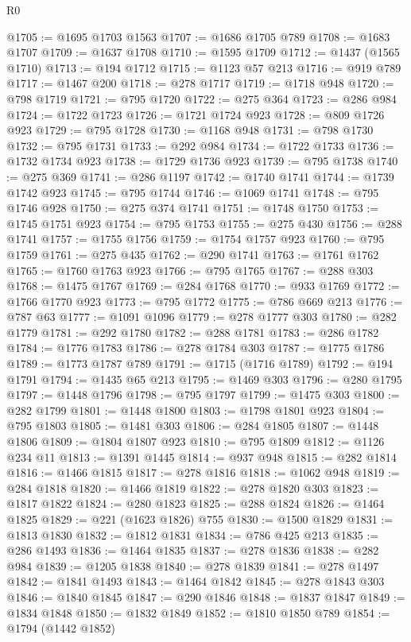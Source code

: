\begin{lexlean}{R0}
\begin{coremodule}
@1705 := @1695 @1703 @1563
@1707 := @1686 @1705 @789
@1708 := @1683 @1707
@1709 := @1637 @1708
@1710 := @1595 @1709
@1712 := @1437 (@1565 @1710)
@1713 := @194 @1712
@1715 := @1123 @57 @213
@1716 := @919 @789
@1717 := @1467 @200
@1718 := @278 @1717
@1719 := @1718 @948
@1720 := @798 @1719
@1721 := @795 @1720
@1722 := @275 @364
@1723 := @286 @984
@1724 := @1722 @1723
@1726 := @1721 @1724 @923
@1728 := @809 @1726 @923
@1729 := @795 @1728
@1730 := @1168 @948
@1731 := @798 @1730
@1732 := @795 @1731
@1733 := @292 @984
@1734 := @1722 @1733
@1736 := @1732 @1734 @923
@1738 := @1729 @1736 @923
@1739 := @795 @1738
@1740 := @275 @369
@1741 := @286 @1197
@1742 := @1740 @1741
@1744 := @1739 @1742 @923
@1745 := @795 @1744
@1746 := @1069 @1741
@1748 := @795 @1746 @928
@1750 := @275 @374 @1741
@1751 := @1748 @1750
@1753 := @1745 @1751 @923
@1754 := @795 @1753
@1755 := @275 @430
@1756 := @288 @1741
@1757 := @1755 @1756
@1759 := @1754 @1757 @923
@1760 := @795 @1759
@1761 := @275 @435
@1762 := @290 @1741
@1763 := @1761 @1762
@1765 := @1760 @1763 @923
@1766 := @795 @1765
@1767 := @288 @303
@1768 := @1475 @1767
@1769 := @284 @1768
@1770 := @933 @1769
@1772 := @1766 @1770 @923
@1773 := @795 @1772
@1775 := @786 @669 @213
@1776 := @787 @63
@1777 := @1091 @1096
@1779 := @278 @1777 @303
@1780 := @282 @1779
@1781 := @292 @1780
@1782 := @288 @1781
@1783 := @286 @1782
@1784 := @1776 @1783
@1786 := @278 @1784 @303
@1787 := @1775 @1786
@1789 := @1773 @1787 @789
@1791 := @1715 (@1716 @1789)
@1792 := @194 @1791
@1794 := @1435 @65 @213
@1795 := @1469 @303
@1796 := @280 @1795
@1797 := @1448 @1796
@1798 := @795 @1797
@1799 := @1475 @303
@1800 := @282 @1799
@1801 := @1448 @1800
@1803 := @1798 @1801 @923
@1804 := @795 @1803
@1805 := @1481 @303
@1806 := @284 @1805
@1807 := @1448 @1806
@1809 := @1804 @1807 @923
@1810 := @795 @1809
@1812 := @1126 @234 @11
@1813 := @1391 @1445
@1814 := @937 @948
@1815 := @282 @1814
@1816 := @1466 @1815
@1817 := @278 @1816
@1818 := @1062 @948
@1819 := @284 @1818
@1820 := @1466 @1819
@1822 := @278 @1820 @303
@1823 := @1817 @1822
@1824 := @280 @1823
@1825 := @288 @1824
@1826 := @1464 @1825
@1829 := @221 (@1623 @1826) @755
@1830 := @1500 @1829
@1831 := @1813 @1830
@1832 := @1812 @1831
@1834 := @786 @425 @213
@1835 := @286 @1493
@1836 := @1464 @1835
@1837 := @278 @1836
@1838 := @282 @984
@1839 := @1205 @1838
@1840 := @278 @1839
@1841 := @278 @1497
@1842 := @1841 @1493
@1843 := @1464 @1842
@1845 := @278 @1843 @303
@1846 := @1840 @1845
@1847 := @290 @1846
@1848 := @1837 @1847
@1849 := @1834 @1848
@1850 := @1832 @1849
@1852 := @1810 @1850 @789
@1854 := @1794 (@1442 @1852)

\end{coremodule}
\end{lexlean}
